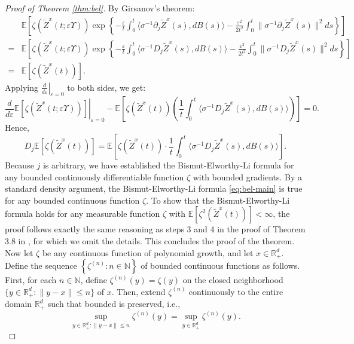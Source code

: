 \documentclass[11pt]{article}
\theoremstyle{definition}
\theoremstyle{plain}
\newcommand{\R}{\mathbb{R}}
\newcommand{\E}{\mathbb{E}}
\newcommand{\N}{\mathbb{N}}
\newcommand{\veps}{\varepsilon}
\begin{document}
\begin{proof}[Proof of Theorem \ref{thm:bel}]
By Girsanov’s theorem:
\begin{align*}
&\mathbb{E} \left[
\zeta(\tilde{Z}^x(t; \varepsilon \Upsilon)) \exp\left\{
- \frac{\veps}{t} \int_0^t \langle \sigma^{-1} \partial_j \tilde{Z}^x(s), dB(s) \rangle
- \frac{\varepsilon^2}{2t^2} \int_0^t \| \sigma^{-1} \partial_j \tilde{Z}^x(s) \|^2 ds
\right\} \right] \\
= & \mathbb{E} \left[
\zeta(\tilde{Z}^x(t; \varepsilon \Upsilon)) \exp\left\{
- \frac{\veps}{t} \int_0^t \langle \sigma^{-1} D_j \tilde{Z}^x(s), dB(s) \rangle
- \frac{\varepsilon^2}{2t^2} \int_0^t \| \sigma^{-1} D_j \tilde{Z}^x(s) \|^2 ds
\right\} \right]\\
= & \mathbb{E} \left[ \zeta( \tilde{Z}^x(t) ) \right].
\end{align*}
Applying \( \left. \frac{d}{d\varepsilon} \right|_{\varepsilon=0} \) to both sides, we get:
\[
\left. \frac{d}{d\varepsilon} \mathbb{E} \left[ \zeta( \tilde{Z}^x(t; \varepsilon \Upsilon) ) \right] \right|_{\varepsilon=0} 
- \mathbb{E} \left[ \zeta( \tilde{Z}^x(t) ) \left( \frac{1}{t} \int_0^t \langle \sigma^{-1} D_j \tilde{Z}^x(s), dB(s) \rangle \right) \right] = 0.
\]
Hence,
\[
D_j \mathbb{E} \left[ \zeta( \tilde{Z}^x(t) ) \right]
= \mathbb{E} \left[ \zeta( \tilde{Z}^x(t) )\cdot \frac{1}{t}\int_0^t \langle \sigma^{-1} D_j \tilde{Z}^x(s), dB(s) \rangle \right].
\]
Because $j$ is arbitrary, we have established the Bismut-Elworthy-Li formula for any bounded continuously differentiable function $\zeta$ with bounded gradients. 
By a standard density argument, the Bismut-Elworthy-Li formula \eqref{eq:bel-main} is true for any bounded continuous function $\zeta$. 
To show that the Bismut-Elworthy-Li formula holds for any measurable function $\zeta$ with $\E[\zeta^2(\tilde Z^x(t))] < \infty$, 
the proof follows exactly the same reasoning as steps 3 and 4 in the proof of Theorem 3.8 in \cite{Banos2018}, for which we omit the details. 
This concludes the proof of the theorem.
\iffalse
Now let \( \zeta \) be any continuous function of polynomial growth, and let $x\in \R_+^d$. 
Define the sequence $\left\{\zeta^{(n)} : n\in \N\right\}$ of bounded continuous functions as follows. 
First, for each $n \in \N$, define $\zeta^{(n)}(y) = \zeta(y)$ on the closed neighborhood $\{y \in \R_+^d : \|y-x\|\leq n\}$ of $x$. 
Then, extend $\zeta^{(n)}$ continuously to the entire domain $\R_+^d$ 
such that bounded is preserved, i.e., 
\[
\sup_{y \in  \R_+^d : \|y-x\|\leq n} \zeta^{(n)}(y) = \sup_{y \in  \R_+^d} \zeta^{(n)}(y). 
\]
\end{proof}
\end{document}
